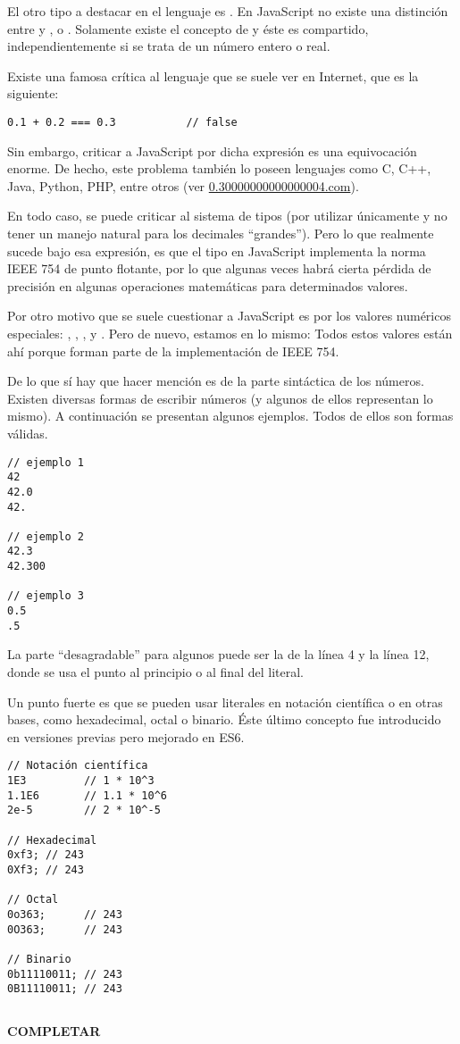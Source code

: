 El otro tipo a destacar en el lenguaje es . En JavaScript no existe una distinción entre  y ,  o . Solamente existe el concepto de  y éste es compartido, independientemente si se trata de un número entero o real.

Existe una famosa crítica al lenguaje que se suele ver en Internet, que es la siguiente:

\begin{lstlisting}
0.1 + 0.2 === 0.3			// false
\end{lstlisting}

Sin embargo, criticar a JavaScript por dicha expresión es una equivocación enorme. De hecho, este problema también lo poseen lenguajes como C, C++, Java, Python, PHP, entre otros (ver \href{https://0.30000000000000004.com/}{0.30000000000000004.com}). 

En todo caso, se puede criticar al sistema de tipos (por utilizar únicamente  y no tener un manejo natural para los decimales "`grandes"'). Pero lo que realmente sucede bajo esa expresión, es que el tipo  en JavaScript implementa la norma IEEE 754 de punto flotante, por lo que algunas veces habrá cierta pérdida de precisión en algunas operaciones matemáticas para determinados valores. 

Por otro motivo que se suele cuestionar a JavaScript es por los valores numéricos especiales: , , ,  y . Pero de nuevo, estamos en lo mismo: Todos estos valores están ahí porque forman parte de la implementación de IEEE 754.

De lo que sí hay que hacer mención es de la parte sintáctica de los números. Existen diversas formas de escribir números (y algunos de ellos representan lo mismo). A continuación se presentan algunos ejemplos. Todos de ellos son formas válidas.

\begin{lstlisting}
// ejemplo 1
42
42.0
42.

// ejemplo 2
42.3
42.300

// ejemplo 3
0.5
.5
\end{lstlisting}

La parte "`desagradable"' para algunos puede ser la de la línea 4 y la línea 12, donde se usa el punto al principio o al final del literal. 

Un punto fuerte es que se pueden usar literales en notación científica o en otras bases, como hexadecimal, octal o binario. Éste último concepto fue introducido en versiones previas pero mejorado en ES6.

\begin{lstlisting}
// Notación científica
1E3			// 1 * 10^3
1.1E6		// 1.1 * 10^6
2e-5		// 2 * 10^-5

// Hexadecimal
0xf3; // 243
0Xf3; // 243

// Octal
0o363;		// 243
0O363;		// 243

// Binario
0b11110011;	// 243
0B11110011; // 243
\end{lstlisting}

\subsection{}

\textbf{COMPLETAR}

